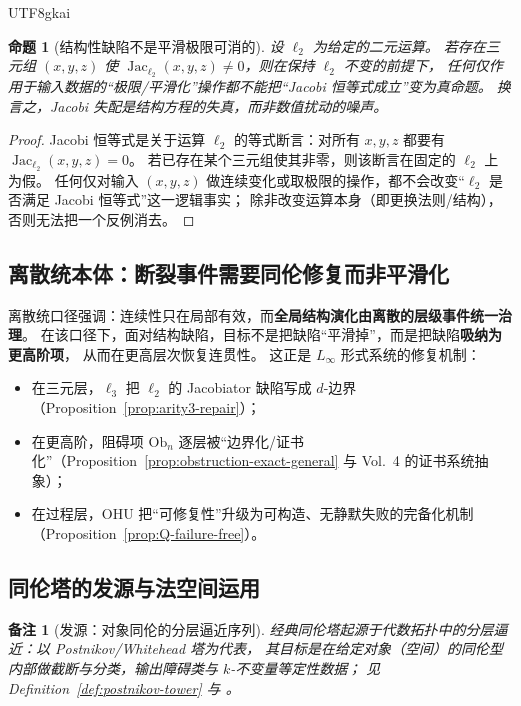 \documentclass[12pt]{article}
\newtheorem{proposition}{命题}[section]
\newtheorem{remark}{备注}[section]
\newcommand{\Layer}{\ensuremath{\ell}}
\newcommand{\Jac}{\operatorname{Jac}}
\newcommand{\Ob}{\mathrm{Ob}}
\begin{document}
\begin{CJK*}{UTF8}{gkai}
\begin{proposition}[结构性缺陷不是平滑极限可消的]
\label{prop:defect-not-removed-by-smoothing}
设 $\Layer_2$ 为给定的二元运算。
若存在三元组 $(x,y,z)$ 使 $\Jac_{\Layer_2}(x,y,z)\neq 0$，则在保持 $\Layer_2$ 不变的前提下，
任何仅作用于输入数据的“极限/平滑化”操作都不能把“Jacobi 恒等式成立”变为真命题。
换言之，Jacobi 失配是\emph{结构方程的失真}，而非\emph{数值扰动的噪声}。
\end{proposition}

\begin{proof}
Jacobi 恒等式是关于运算 $\Layer_2$ 的等式断言：对所有 $x,y,z$ 都要有 $\Jac_{\Layer_2}(x,y,z)=0$。
若已存在某个三元组使其非零，则该断言在固定的 $\Layer_2$ 上为假。
任何仅对输入 $(x,y,z)$ 做连续变化或取极限的操作，都不会改变“$\Layer_2$ 是否满足 Jacobi 恒等式”这一逻辑事实；
除非改变运算本身（即更换法则/结构），否则无法把一个反例消去。
\end{proof}

\subsection{离散统本体：断裂事件需要同伦修复而非平滑化}

离散统口径强调：连续性只在局部有效，而\textbf{全局结构演化由离散的层级事件统一治理}。%
\cite{HomotopyMinimalityDialogue}
在该口径下，面对结构缺陷，目标不是把缺陷“平滑掉”，而是把缺陷\textbf{吸纳为更高阶项}，
从而在更高层次恢复连贯性。
这正是 $L_\infty$ 形式系统的修复机制：
\begin{itemize}
  \item 在三元层，$\Layer_3$ 把 $\Layer_2$ 的 Jacobiator 缺陷写成 $d$-边界（Proposition~\ref{prop:arity3-repair}）；
  \item 在更高阶，阻碍项 $\Ob_n$ 逐层被“边界化/证书化”（Proposition~\ref{prop:obstruction-exact-general} 与 Vol.~4 的证书系统抽象）；
  \item 在过程层，OHU 把“可修复性”升级为可构造、无静默失败的完备化机制（Proposition~\ref{prop:Q-failure-free}）。
\end{itemize}

\subsection{同伦塔的发源与法空间运用}

\begin{remark}[发源：对象同伦的分层逼近序列]
经典同伦塔起源于代数拓扑中的分层逼近：以 Postnikov/Whitehead 塔为代表，
其目标是在给定对象（空间）的同伦型内部做截断与分类，输出障碍类与 $k$-不变量等定性数据；
见 Definition~\ref{def:postnikov-tower} 与 \cite{HatcherAT}。
\end{remark}


\end{CJK*}
\end{document}
